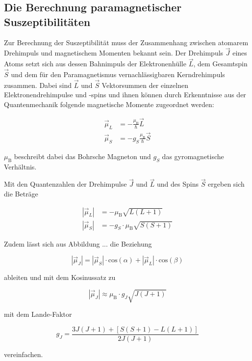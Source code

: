 \subsection{Die Berechnung paramagnetischer Suszeptibilitäten}

Zur Berechnung der Suszeptibilität muss der Zusammenhang zwischen atomarem Drehimpuls
und magnetischem Momenten bekannt sein. Der Drehimpuls $\vec{J}$ eines Atoms setzt sich
aus dessen Bahnimpuls der Elektronenhülle $\vec{L}$, dem Gesamtspin $\vec{S}$
und dem für den Paramagnetismus vernachlässigbaren Kerndrehimpuls zusammen.
Dabei sind $\vec{L}$ und $\vec{S}$ Vektorsummen der einzelnen Elektronendrehimpulse
und -spins und ihnen können durch Erkenntnisse aus der Quantenmechanik folgende
magnetische Momente zugeordnet werden:

\begin{align}
    \vec{\mu}_L &= - \frac{\mu_\text{B}}{\hbar} \vec{L} \\
    \vec{\mu}_S &= - g_S \frac{\mu_\text{B}}{\hbar} \vec{S}
\end{align}

$\mu_\text{B}$ beschreibt dabei das Bohrsche Magneton und $g_S$ das
gyromagnetische Verhältnis.

Mit den Quantenzahlen der Drehimpulse $\vec{J}$ und $\vec{L}$ und des Spins $\vec{S}$
ergeben sich die Beträge

\begin{align}
    |\vec{\mu}_L| &= - \mu_\text{B} \sqrt{L\left(L+1\right)}\\
    |\vec{\mu}_S| &= - g_S \cdot \mu_\text{B} \sqrt{S\left(S+1\right)}
\end{align}

Zudem lässt sich aus Abbildung ... die Beziehung

\begin{equation}
    |\vec{\mu}_J| = |\vec{\mu}_S| \cdot \text{cos}\left(\alpha \right) + 
    |\vec{\mu}_L| \cdot \text{cos}\left(\beta \right)
\end{equation}

ableiten und mit dem Kosinussatz zu 

\begin{equation}
    |\vec{\mu}_J| \approx \mu_\text{B} \cdot g_J \sqrt{J\left(J+1\right)}
\end{equation}

mit dem Lande-Faktor 

\begin{equation}
    g_J = \frac{3J(J+1) + [S(S+1) - L(L+1)]} {2 J(J+1)}
\end{equation}

vereinfachen.




















